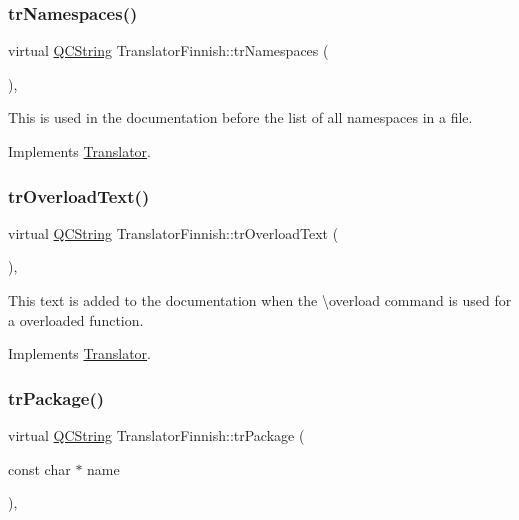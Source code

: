 \subsubsection{\texorpdfstring{trNamespaces()}{trNamespaces()}}
{\footnotesize\ttfamily virtual \mbox{\hyperlink{class_q_c_string}{Q\+C\+String}} Translator\+Finnish\+::tr\+Namespaces (\begin{DoxyParamCaption}{ }\end{DoxyParamCaption})\hspace{0.3cm}{\ttfamily [inline]}, {\ttfamily [virtual]}}

This is used in the documentation before the list of all namespaces in a file. 

Implements \mbox{\hyperlink{class_translator}{Translator}}.

\mbox{\label{class_translator_finnish_a9aad060ef275958bd709f729194853bd}} 
\subsubsection{\texorpdfstring{trOverloadText()}{trOverloadText()}}
{\footnotesize\ttfamily virtual \mbox{\hyperlink{class_q_c_string}{Q\+C\+String}} Translator\+Finnish\+::tr\+Overload\+Text (\begin{DoxyParamCaption}{ }\end{DoxyParamCaption})\hspace{0.3cm}{\ttfamily [inline]}, {\ttfamily [virtual]}}

This text is added to the documentation when the \textbackslash{}overload command is used for a overloaded function. 

Implements \mbox{\hyperlink{class_translator}{Translator}}.

\mbox{\label{class_translator_finnish_a22f33d46cdc2584f489abc5af75a9d1b}} 
\subsubsection{\texorpdfstring{trPackage()}{trPackage()}}
{\footnotesize\ttfamily virtual \mbox{\hyperlink{class_q_c_string}{Q\+C\+String}} Translator\+Finnish\+::tr\+Package (\begin{DoxyParamCaption}\item[{const char $\ast$}]{name }\end{DoxyParamCaption})\hspace{0.3cm}{\ttfamily [inline]}, {\ttfamily [virtual]}}

